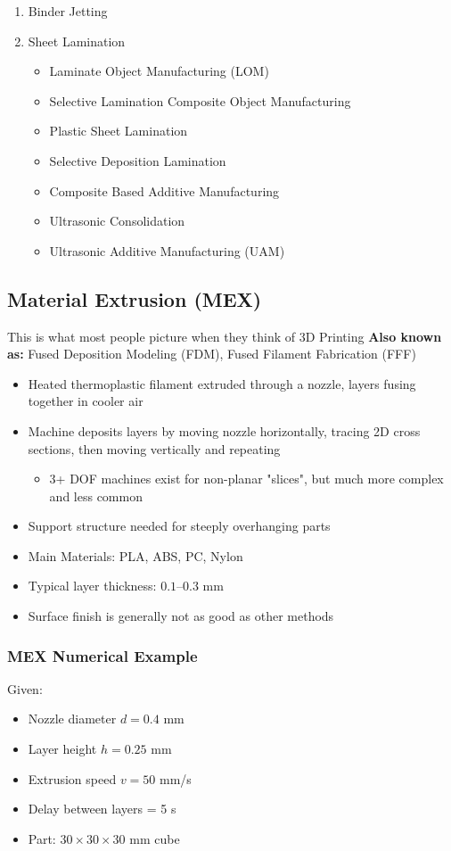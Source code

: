 \documentclass{article}
\begin{document}
\begin{enumerate}
\begin{itemize}
    \end{itemize}
    \item Binder Jetting
    \item Sheet Lamination 
    \begin{itemize}
        \item Laminate Object Manufacturing (LOM)
        \item Selective Lamination Composite Object Manufacturing
        \item Plastic Sheet Lamination
        \item Selective Deposition Lamination
        \item Composite Based Additive Manufacturing
        \item Ultrasonic Consolidation
        \item Ultrasonic Additive Manufacturing (UAM)
    \end{itemize}
\end{enumerate}

\subsection{Material Extrusion (MEX)}
This is what most people picture when they think of 3D Printing
\textbf{Also known as:} Fused Deposition Modeling (FDM), Fused Filament Fabrication (FFF)

\begin{itemize}
    \item Heated thermoplastic filament extruded through a nozzle, layers fusing together in cooler air
    \item Machine deposits layers by moving nozzle horizontally, tracing 2D cross sections, then moving vertically and repeating
    \begin{itemize}
        \item 3+ DOF machines exist for non-planar "slices", but much more complex and less common
    \end{itemize}
    \item Support structure needed for steeply overhanging parts
    \item Main Materials: PLA, ABS, PC, Nylon
    \item Typical layer thickness: $0.1$–$0.3$ mm
    \item Surface finish is generally not as good as other methods
\end{itemize}

\subsubsection{MEX Numerical Example}
Given:
\begin{itemize}
    \item Nozzle diameter $d = 0.4$ mm
    \item Layer height $h = 0.25$ mm
    \item Extrusion speed $v = 50$ mm/s
    \item Delay between layers = 5 s
    \item Part: $30 \times 30 \times 30$ mm cube
\end{itemize}
\end{document}
